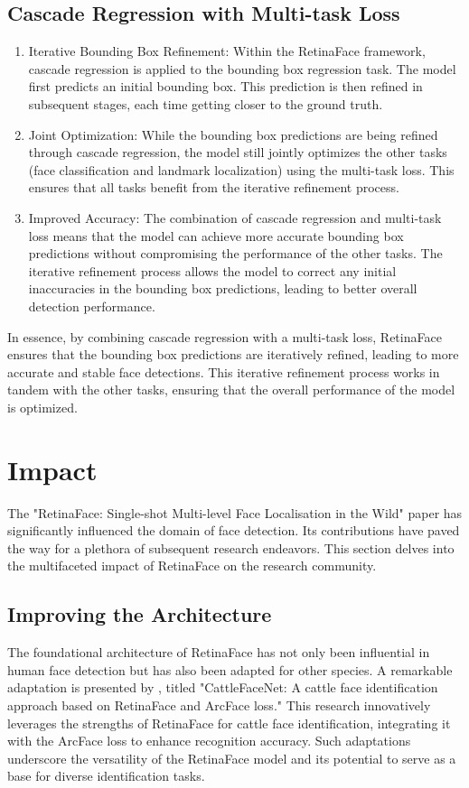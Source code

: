 \documentclass{article}
\begin{document}
\subsection{Cascade Regression with Multi-task Loss}

\begin{enumerate}
\item Iterative Bounding Box Refinement: Within the RetinaFace framework, cascade regression is applied to the bounding box regression task. The model first predicts an initial bounding box. This prediction is then refined in subsequent stages, each time getting closer to the ground truth.
\item Joint Optimization: While the bounding box predictions are being refined through cascade regression, the model still jointly optimizes the other tasks (face classification and landmark localization) using the multi-task loss. This ensures that all tasks benefit from the iterative refinement process.
\item Improved Accuracy: The combination of cascade regression and multi-task loss means that the model can achieve more accurate bounding box predictions without compromising the performance of the other tasks. The iterative refinement process allows the model to correct any initial inaccuracies in the bounding box predictions, leading to better overall detection performance.
\end{enumerate}

In essence, by combining cascade regression with a multi-task loss, RetinaFace ensures that the bounding box predictions are iteratively refined, leading to more accurate and stable face detections. This iterative refinement process works in tandem with the other tasks, ensuring that the overall performance of the model is optimized.

\section{Impact}

The "RetinaFace: Single-shot Multi-level Face Localisation in the Wild" paper has significantly influenced the domain of face detection. Its contributions have paved the way for a plethora of subsequent research endeavors. This section delves into the multifaceted impact of RetinaFace on the research community.

\subsection{Improving the Architecture}
The foundational architecture of RetinaFace has not only been influential in human face detection but has also been adapted for other species. A remarkable adaptation is presented by \cite{xu2022cattlefacenet}, titled "CattleFaceNet: A cattle face identification approach based on RetinaFace and ArcFace loss." This research innovatively leverages the strengths of RetinaFace for cattle face identification, integrating it with the ArcFace loss to enhance recognition accuracy. Such adaptations underscore the versatility of the RetinaFace model and its potential to serve as a base for diverse identification tasks.
\end{document}
